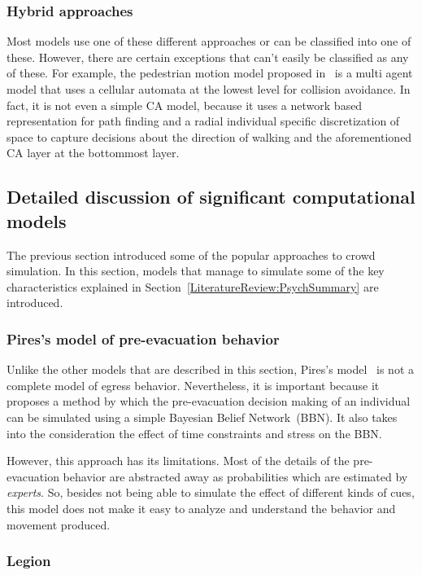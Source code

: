 \subsubsection{Hybrid approaches}
Most models use one of these different approaches or can be classified into one of these. However, there are certain exceptions that can't easily be classified as any of these. For example, the pedestrian motion model proposed in~\cite{Bierlaire:2003uj} is a multi agent model that uses a cellular automata at the lowest level for collision avoidance. In fact, it is not even a simple CA model, because it uses a network based representation for path finding and a radial individual specific discretization of space to capture decisions about the direction of walking and the aforementioned CA layer at the bottommost layer.

\subsection{Detailed discussion of significant computational models}
\label{LiteratureReview:DetailedModels}

The previous section introduced some of the popular approaches to crowd simulation. In this section, models that manage to simulate some of the key characteristics explained in Section~\ref{LiteratureReview:PsychSummary} are introduced.

\subsubsection{Pires's model of pre-evacuation behavior}

Unlike the other models that are described in this section, Pires's model~\cite{Pires:2005gs} is not a complete model of egress behavior. Nevertheless, it is important because it proposes a method by which the pre-evacuation decision making of an individual can be simulated using a simple Bayesian Belief Network~(BBN). It also takes into the consideration the effect of time constraints and stress on the BBN.

However, this approach has its limitations. Most of the details of the pre-evacuation behavior are abstracted away as probabilities which are estimated by \emph{experts}. So, besides not being able to simulate the effect of different kinds of cues, this model does not make it easy to analyze and understand the behavior and movement produced.

\subsubsection{Legion}

